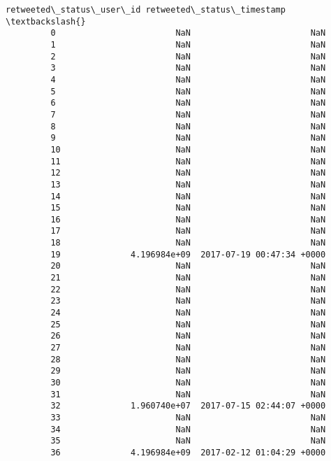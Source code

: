 \documentclass[11pt]{article}
\begin{document}
\begin{Verbatim}[commandchars=\\\{\}]
             retweeted\_status\_user\_id retweeted\_status\_timestamp  \textbackslash{}
         0                        NaN                        NaN   
         1                        NaN                        NaN   
         2                        NaN                        NaN   
         3                        NaN                        NaN   
         4                        NaN                        NaN   
         5                        NaN                        NaN   
         6                        NaN                        NaN   
         7                        NaN                        NaN   
         8                        NaN                        NaN   
         9                        NaN                        NaN   
         10                       NaN                        NaN   
         11                       NaN                        NaN   
         12                       NaN                        NaN   
         13                       NaN                        NaN   
         14                       NaN                        NaN   
         15                       NaN                        NaN   
         16                       NaN                        NaN   
         17                       NaN                        NaN   
         18                       NaN                        NaN   
         19              4.196984e+09  2017-07-19 00:47:34 +0000   
         20                       NaN                        NaN   
         21                       NaN                        NaN   
         22                       NaN                        NaN   
         23                       NaN                        NaN   
         24                       NaN                        NaN   
         25                       NaN                        NaN   
         26                       NaN                        NaN   
         27                       NaN                        NaN   
         28                       NaN                        NaN   
         29                       NaN                        NaN   
         30                       NaN                        NaN   
         31                       NaN                        NaN   
         32              1.960740e+07  2017-07-15 02:44:07 +0000   
         33                       NaN                        NaN   
         34                       NaN                        NaN   
         35                       NaN                        NaN   
         36              4.196984e+09  2017-02-12 01:04:29 +0000   

\end{Verbatim}
\end{document}
